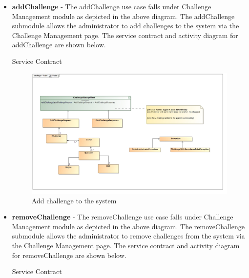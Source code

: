 \documentclass[english]{article}
\begin{document}
		\begin{itemize}
			\item \textbf{addChallenge} -  The addChallenge use case falls under Challenge Management module as depicted in the above diagram.  The addChallenge submodule allows the administrator to add challenges to the system via the Challenge Management page. The service contract and activity diagram for addChallenge are shown below. \newpage
			\begin{center}
				Service Contract
			\end{center}
			
			\begin{figure}[H]
				\begin{center}
					\includegraphics[scale=0.25]{AddChallengeContract.jpg}
				\end{center}
				\caption{Add challenge to the system}
				
			\end{figure}
			
			
		 \item \textbf{removeChallenge} -  The removeChallenge use case falls under Challenge Management module as depicted in the above diagram.  The removeChallenge submodule allows the administrator to remove challenges from the system via the Challenge Management page. The service contract and activity diagram for removeChallenge are shown below.
			\newpage
		 	\begin{center}
		 		Service Contract
		 	\end{center}
		 	

\end{itemize}
\end{document}
